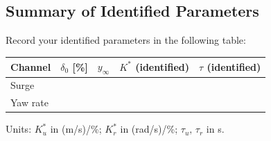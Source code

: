 \documentclass[../../book.tex]{subfiles}
\begin{document}
\subsection{Summary of Identified Parameters}

Record your identified parameters in the following table:

\vspace{6pt}
\begin{center}
\begin{tabular}{C{2.2cm} C{2.2cm} C{2.2cm} C{2.2cm} C{2.2cm}}
  \textbf{Channel} & \textbf{$\delta_0$ [\%]} & \textbf{$y_\infty$} &
  \textbf{$K^*$ (identified)} & \textbf{$\tau$ (identified)} \\
  \midrule
  Surge & & & & \\[8pt]
  Yaw rate & & & & \\[8pt]
  \bottomrule
\end{tabular}
\end{center}
\vspace{6pt}

\noindent Units: $K_u^*$ in (m/s)/\%;\; $K_r^*$ in (rad/s)/\%;\;
$\tau_u,\,\tau_r$ in s.
\end{document}
